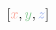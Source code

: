 \documentclass[preview]{standalone}
\begin{document}
$\left[\textcolor[HTML]{f9a598}{x}, \textcolor[HTML]{87c993}{y}, \textcolor[HTML]{94acef}{z}\right]$
\end{document}
